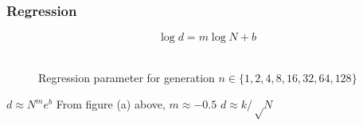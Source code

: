 \documentclass[aspectratio=169]{beamer}
\begin{document}
  \begin{frame}
    \frametitle{Regression}
    \[\log d = m \log N + b\]
    \mbox{}\\[-0.5in]
    \begin{figure}[!ht]
      \begin{center}
	\hspace{5pt}
	\caption[]{Regression parameter for generation $n \in \{1, 2, 4, 8, 16, 32, 64, 128\}$ }	
      \end{center}
    \end{figure}
    $d \approx N^m e^b$
    \newline
    From figure (a) above, $m \approx -0.5$ 
    \newline
    $d \approx k / √N$
  \end{frame}  
  
\end{document}
